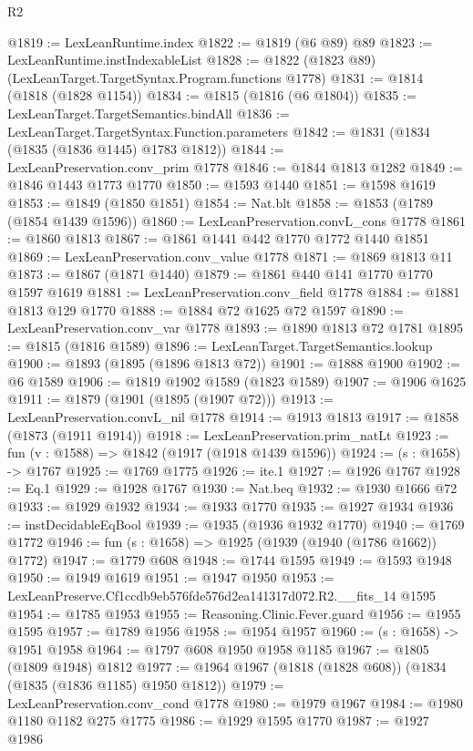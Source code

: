 \begin{lexlean}{R2}
\begin{coremodule}
@1819 := LexLeanRuntime.index
@1822 := @1819 (@6 @89) @89
@1823 := LexLeanRuntime.instIndexableList
@1828 := @1822 (@1823 @89) (LexLeanTarget.TargetSyntax.Program.functions @1778)
@1831 := @1814 (@1818 (@1828 @1154))
@1834 := @1815 (@1816 (@6 @1804))
@1835 := LexLeanTarget.TargetSemantics.bindAll
@1836 := LexLeanTarget.TargetSyntax.Function.parameters
@1842 := @1831 (@1834 (@1835 (@1836 @1445) @1783 @1812))
@1844 := LexLeanPreservation.conv_prim @1778
@1846 := @1844 @1813 @1282
@1849 := @1846 @1443 @1773 @1770
@1850 := @1593 @1440
@1851 := @1598 @1619
@1853 := @1849 (@1850 @1851)
@1854 := Nat.blt
@1858 := @1853 (@1789 (@1854 @1439 @1596))
@1860 := LexLeanPreservation.convL_cons @1778
@1861 := @1860 @1813
@1867 := @1861 @1441 @442 @1770 @1772 @1440 @1851
@1869 := LexLeanPreservation.conv_value @1778
@1871 := @1869 @1813 @11
@1873 := @1867 (@1871 @1440)
@1879 := @1861 @440 @141 @1770 @1770 @1597 @1619
@1881 := LexLeanPreservation.conv_field @1778
@1884 := @1881 @1813 @129 @1770
@1888 := @1884 @72 @1625 @72 @1597
@1890 := LexLeanPreservation.conv_var @1778
@1893 := @1890 @1813 @72 @1781
@1895 := @1815 (@1816 @1589)
@1896 := LexLeanTarget.TargetSemantics.lookup
@1900 := @1893 (@1895 (@1896 @1813 @72))
@1901 := @1888 @1900
@1902 := @6 @1589
@1906 := @1819 @1902 @1589 (@1823 @1589)
@1907 := @1906 @1625
@1911 := @1879 (@1901 (@1895 (@1907 @72)))
@1913 := LexLeanPreservation.convL_nil @1778
@1914 := @1913 @1813
@1917 := @1858 (@1873 (@1911 @1914))
@1918 := LexLeanPreservation.prim_natLt
@1923 := fun (v : @1588) => @1842 (@1917 (@1918 @1439 @1596))
@1924 := (s : @1658) -> @1767
@1925 := @1769 @1775
@1926 := ite.{1}
@1927 := @1926 @1767
@1928 := Eq.{1}
@1929 := @1928 @1767
@1930 := Nat.beq
@1932 := @1930 @1666 @72
@1933 := @1929 @1932
@1934 := @1933 @1770
@1935 := @1927 @1934
@1936 := instDecidableEqBool
@1939 := @1935 (@1936 @1932 @1770)
@1940 := @1769 @1772
@1946 := fun (s : @1658) => @1925 (@1939 (@1940 (@1786 @1662)) @1772)
@1947 := @1779 @608
@1948 := @1744 @1595
@1949 := @1593 @1948
@1950 := @1949 @1619
@1951 := @1947 @1950
@1953 := LexLeanPreserve.Cf1ccdb9eb576fde576d2ea141317d072.R2.__fits_14 @1595
@1954 := @1785 @1953
@1955 := Reasoning.Clinic.Fever.guard
@1956 := @1955 @1595
@1957 := @1789 @1956
@1958 := @1954 @1957
@1960 := (s : @1658) -> @1951 @1958
@1964 := @1797 @608 @1950 @1958 @1185
@1967 := @1805 (@1809 @1948) @1812
@1977 := @1964 @1967 (@1818 (@1828 @608)) (@1834 (@1835 (@1836 @1185) @1950 @1812))
@1979 := LexLeanPreservation.conv_cond @1778
@1980 := @1979 @1967
@1984 := @1980 @1180 @1182 @275 @1775
@1986 := @1929 @1595 @1770
@1987 := @1927 @1986

\end{coremodule}
\end{lexlean}
